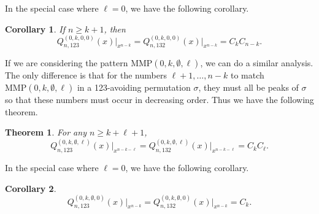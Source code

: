 \documentclass[
final,nomarks
]{dmtcs-episciences}
\newtheorem{theorem}{Theorem}
\newtheorem{corollary}{Corollary}
\newcommand{\Qmmn}[2]{Q_{#2,132}^{(#1)}(x)}
\newcommand{\Qmn}[2]{Q_{#2,123}^{(#1)}(x)}
\newcommand{\MMP}{\mathrm{MMP}}
\begin{document}
In the special case where \begin{math}\ell=0\end{math}, we have the following corollary. 
\begin{corollary}\label{corollary:4} If \begin{math}n \geq k+1\end{math}, then 
\begin{equation}
\Qmn{0,k,0,0}{n}\big\vert_{x^{n-k}}=\Qmmn{0,k,0,0}{n}\big\vert_{x^{n-k}}=C_k C_{n-k}.
\end{equation}
\end{corollary}


If we are considering the pattern \begin{math}\MMP(0,k,\emptyset,\ell)\end{math}, we can do a similar 
analysis.  The only difference is that for the numbers \begin{math}\ell+1, \ldots, n-k\end{math} to 
match \begin{math}\MMP(0,k,\emptyset,\ell)\end{math} in a 123-avoiding permutation \begin{math}\sigma\end{math}, they must all be peaks of \begin{math}\sigma\end{math} 
so that these numbers must occur in decreasing order. Thus we have the following 
theorem.
\begin{theorem}\label{theorem:04} For any \begin{math}n \geq k+\ell +1\end{math}, 
\begin{equation}
\Qmn{0,k,\emptyset,\ell}{n}\big\vert_{x^{n-k-\ell}}=\Qmmn{0,k,\emptyset,\ell}{n}\big\vert_{x^{n-k-\ell}}=C_k C_\ell.
\end{equation}
\end{theorem}


In the special case where \begin{math}\ell =0\end{math}, we have the following corollary.
\begin{corollary}\label{corollary:04}
\begin{equation}
\Qmn{0,k,\emptyset,0}{n}\big\vert_{x^{n-k}}=\Qmmn{0,k,\emptyset,0}{n}\big\vert_{x^{n-k}}=C_k.
\end{equation}
\end{corollary}
\end{document}
